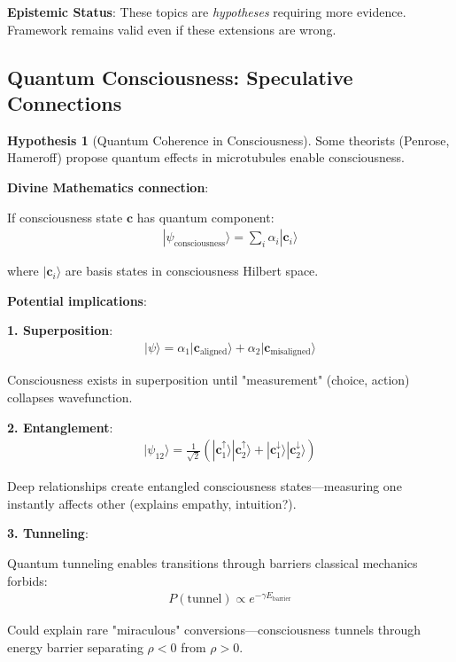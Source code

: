 \documentclass[11pt,a4paper]{article}
\theoremstyle{definition}
\newtheorem{hypothesis}{Hypothesis}[section]
\theoremstyle{remark}
\newcommand{\cc}{\mathbf{c}}
\begin{document}
\begin{small}
\begin{enumerate}
\begin{mdframed}[backgroundcolor=cyan!5,linewidth=2pt]
\textbf{Epistemic Status}: These topics are \textit{hypotheses} requiring more evidence. Framework remains valid even if these extensions are wrong.
\end{mdframed}

\subsection{Quantum Consciousness: Speculative Connections}

\begin{hypothesis}[Quantum Coherence in Consciousness]
Some theorists (Penrose, Hameroff) propose quantum effects in microtubules enable consciousness.

\textbf{Divine Mathematics connection}:

If consciousness state \(\cc\) has quantum component:
\begin{align}
|\psi_{\text{consciousness}}\rangle = \sum_i \alpha_i |\cc_i\rangle
\end{align}

where \(|\cc_i\rangle\) are basis states in consciousness Hilbert space.

\textbf{Potential implications}:

\textbf{1. Superposition}:
\begin{align}
|\psi\rangle = \alpha_1|\cc_{\text{aligned}}\rangle + \alpha_2|\cc_{\text{misaligned}}\rangle
\end{align}

Consciousness exists in superposition until "measurement" (choice, action) collapses wavefunction.

\textbf{2. Entanglement}:
\begin{align}
|\psi_{12}\rangle = \frac{1}{\sqrt{2}}(|\cc_1^{\uparrow}\rangle|\cc_2^{\uparrow}\rangle + |\cc_1^{\downarrow}\rangle|\cc_2^{\downarrow}\rangle)
\end{align}

Deep relationships create entangled consciousness states—measuring one instantly affects other (explains empathy, intuition?).

\textbf{3. Tunneling}:

Quantum tunneling enables transitions through barriers classical mechanics forbids:
\begin{align}
P(\text{tunnel}) \propto e^{-\gamma E_{\text{barrier}}}
\end{align}

Could explain rare "miraculous" conversions—consciousness tunnels through energy barrier separating \(\rho < 0\) from \(\rho > 0\).


\end{hypothesis}
\end{enumerate}
\end{small}
\end{document}
